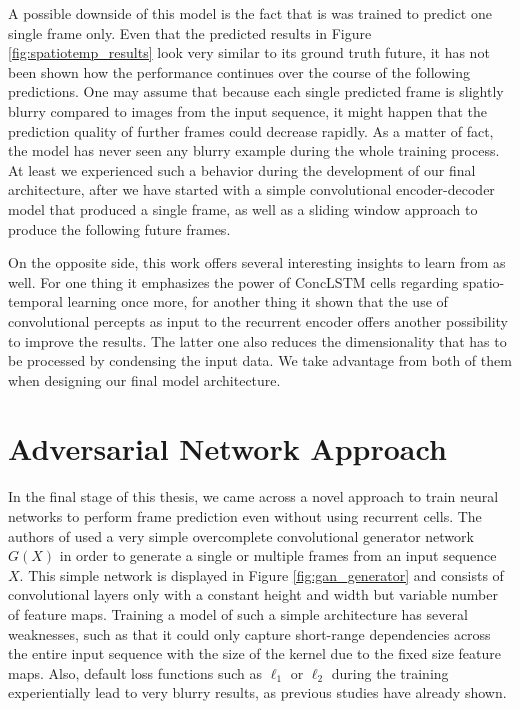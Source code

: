A possible downside of this model is the fact that is was trained to predict one single frame only. Even that the predicted results in Figure \ref{fig:spatiotemp_results} look very similar to its ground truth future, it has not been shown how the performance continues over the course of the following predictions. One may assume that because each single predicted frame is slightly blurry compared to images from the input sequence, it might happen that the prediction quality of further frames could decrease rapidly. As a matter of fact, the model has never seen any blurry example during the whole training process. At least we experienced such a behavior during the development of our final architecture, after we have started with a simple convolutional encoder-decoder model that produced a single frame, as well as a sliding window approach to produce the following future frames.

On the opposite side, this work offers several interesting insights to learn from as well. For one thing it emphasizes the power of ConcLSTM cells regarding spatio-temporal learning once more, for another thing it shown that the use of convolutional percepts as input to the recurrent encoder offers another possibility to improve the results. The latter one also reduces the dimensionality that has to be processed by condensing the input data. We take advantage from both of them when designing our final model architecture.


\section{Adversarial Network Approach}

In the final stage of this thesis, we came across a novel approach to train neural networks to perform frame prediction even without using recurrent cells. The authors of \parencite{deep_multiscale_video_pred} used a very simple overcomplete convolutional generator network $ G(X) $ in order to generate a single or multiple frames from an input sequence $ X $. This simple network is displayed in Figure \ref{fig:gan_generator} and consists of convolutional layers only with a constant height and width but variable number of feature maps. Training a model of such a simple architecture has several weaknesses, such as that it could only capture short-range dependencies across the entire input sequence with the size of the kernel due to the fixed size feature maps. Also, default loss functions such as $\ell_1$ or $\ell_2$ during the training experientially lead to very blurry results, as previous studies have already shown.

